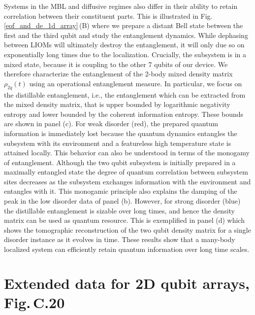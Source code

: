 Systems in the MBL and diffusive regimes also differ in their ability to retain correlation between their constituent parts.  This is illustrated in Fig.\,\ref{eof_and_de_1d_array}\,(B) where we prepare a distant Bell state between the first and the third qubit and study the entanglement dynamics.
While dephasing between LIOMs will ultimately destroy the entanglement, it will only due so on exponentially long times due to the localization.
Crucially, the subsystem is in a mixed state, because it is coupling to the other 7 qubits of our device.
We therefore characterize the entanglement of the 2-body mixed density matrix $\rho_{2q} \left( t \right)$ using an operational entanglement measure.
In particular, we focus on the distillable entanglement, i.e., the entanglement which can be extracted from the mixed density matrix, that is upper bounded by logarithmic negativity entropy and lower bounded by the coherent information entropy.
These bounds are shown in panel (c). For weak disorder (red), the prepared quantum information is immediately lost because the quantum dynamics entangles the subsystem with its environment and a featureless high temperature state is attained locally.
%
This behavior can also be understood in terms of the monogamy of entanglement.\autocite{Wootters2000}
Although the two qubit subsystem is initially prepared in a maximally entangled state the degree of quantum correlation between subsystem sites decreases as the subsystem exchanges information with the environment and entangles with it.
This monogamic principle also explains the damping of the peak in the low disorder data of panel (b).
%
However, for strong disorder (blue) the distillable entanglement is sizable over long times, and hence the density matrix can be used as quantum resource.
This is exemplified in panel (d) which shows the tomographic reconstruction of the two qubit density matrix for a single disorder instance as it evolves in time.
These results show that a many-body localized system can efficiently retain quantum information over long time scales.

\section{Extended data for 2D qubit arrays, Fig.\,C.20}
